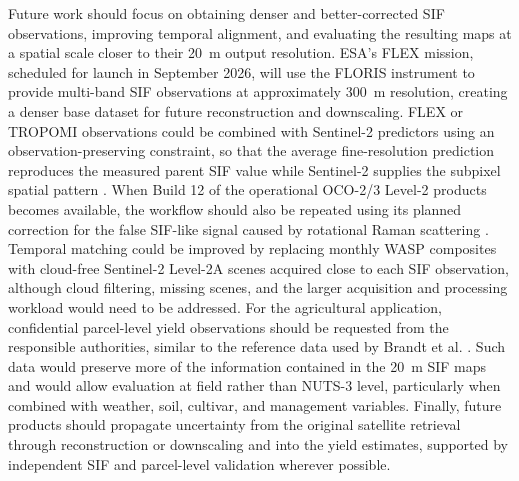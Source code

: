 Future work should focus on obtaining denser and better-corrected SIF observations, improving temporal alignment, and evaluating the resulting maps at a spatial scale closer to their 20~m output resolution. ESA's FLEX mission, scheduled for launch in September 2026, will use the FLORIS instrument to provide multi-band SIF observations at approximately 300~m resolution, creating a denser base dataset for future reconstruction and downscaling. FLEX or TROPOMI observations could be combined with Sentinel-2 predictors using an observation-preserving constraint, so that the average fine-resolution prediction reproduces the measured parent SIF value while Sentinel-2 supplies the subpixel spatial pattern \cite{chen2025improved,zhang2023generating}. When Build 12 of the operational OCO-2/3 Level-2 products becomes available, the workflow should also be repeated using its planned correction for the false SIF-like signal caused by rotational Raman scattering \cite{sanghavi2025impact}. Temporal matching could be improved by replacing monthly WASP composites with cloud-free Sentinel-2 Level-2A scenes acquired close to each SIF observation, although cloud filtering, missing scenes, and the larger acquisition and processing workload would need to be addressed. For the agricultural application, confidential parcel-level yield observations should be requested from the responsible authorities, similar to the reference data used by Brandt et al. \cite{brandt2024ensemble}. Such data would preserve more of the information contained in the 20~m SIF maps and would allow evaluation at field rather than NUTS-3 level, particularly when combined with weather, soil, cultivar, and management variables. Finally, future products should propagate uncertainty from the original satellite retrieval through reconstruction or downscaling and into the yield estimates, supported by independent SIF and parcel-level validation wherever possible.
